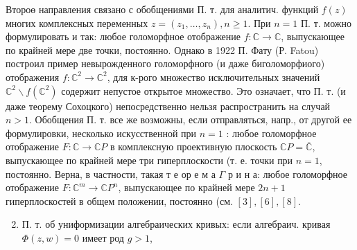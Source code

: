 \documentclass[10pt]{article}
\begin{document}
Второө направления связано с обобщениями П. т. для аналитич. функций $f(z)$ многих комплексных переменных $z=\left(z_{1}, \ldots, z_{n}\right), n \geqslant 1$. При $n=1$ П. т. можно формулировать и так: любое голоморфное отображение $f: \mathbb{C} \rightarrow \mathbb{C}$, выпускающее по крайней мере две точки, постоянно. Однако в 1922 П. Фату (Р. Fatou) построил пример невырожденного голоморфного (и даже биголоморфиого) отображения $f: \mathbb{C}^{2} \rightarrow \mathbb{C}^{2}$, для к-рого множество исключительных значений $\mathbb{C}^{2} \backslash f\left(\mathbb{C}^{2}\right)$ содержит непустое открытое множество. Это означает, что П. т. (и даже теорему Сохоцкого) непосредственно нельзя распространить на случай $n>1$. Обобщения П. т. все же возможны, если отправляться, напр., от другой ее формулировки, несколько искусственной при $n=1$ : любое голоморфное отображение $F: \mathbb{C} \rightarrow \mathbb{C} P$ в комплексную проективную плоскость $\mathbb{C} P=\overline{\mathbb{C}}$, выпускающее по крайней мере три гиперплоскости (т. е. точки при $n=1$, постоянно. Верна, в частности, такая т е ор е м а $\Gamma$ р и н а: любое голоморфное отображение $F: \mathbb{C}^{m} \rightarrow \mathbb{C} P^{n}$, выпускающее по крайней мере $2 n+1$ гиперплоскостей в общем положении, постоянно (см. $[3],[6],[8]$.



\begin{enumerate}

  \setcounter{enumi}{1}

  \item П. т. об униформизации алгебраических кривых: если алгебраич. кривая $\Phi(z, w)=0$ имеет род $g>1$,

\end{enumerate}
\end{document}
